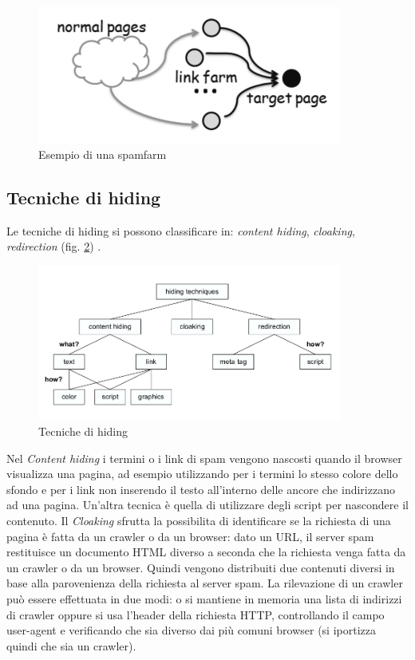 \begin{figure} 
 \centering
 \includegraphics[width=10cm]{immagini/spamfarm}
 \caption{Esempio di una spamfarm}
 \label{fig:spamfarm}
\end{figure}

\subsection{Tecniche di hiding}
Le tecniche di hiding si possono classificare in: \textit{content hiding}, \textit{cloaking}, \textit{redirection} (fig. \ref{fig:tecnicheHiding}) \cite{ilprints646}.
\begin{figure} 
 \centering
 \includegraphics[width=10cm]{immagini/tassonomiaHiding}
 \caption{Tecniche di hiding}
 \label{fig:tecnicheHiding}
\end{figure}
Nel \textit{Content hiding} i termini o i link di spam vengono nascosti quando il browser visualizza una pagina, ad esempio utilizzando per i termini lo stesso colore dello sfondo e per i link non inserendo il testo all'interno delle ancore che indirizzano ad una pagina. Un'altra tecnica è quella di utilizzare degli script per nascondere il contenuto. Il \textit{Cloaking} sfrutta la possibilita di identificare se la richiesta di una pagina è fatta da un crawler o da un browser: dato un URL, il server spam restituisce un documento HTML diverso a seconda che la richiesta venga fatta da un crawler o da un browser. Quindi vengono distribuiti due contenuti diversi in base alla parovenienza della richiesta al server spam. La rilevazione di un crawler può essere effettuata in due modi: o si mantiene in memoria una lista di indirizzi di crawler oppure si usa l'header della richiesta HTTP, controllando il campo user-agent e verificando che sia diverso dai più comuni browser (si iportizza quindi che sia un crawler). 
